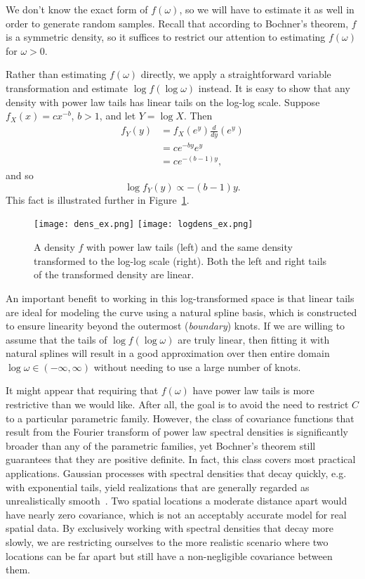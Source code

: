 We don't know the exact form of $f(\omega)$, so we will have to estimate it as well in order to generate random samples. Recall that according to Bochner's theorem, $f$ is a symmetric density, so it suffices to restrict our attention to estimating $f(\omega)$ for $\omega > 0$.

Rather than estimating $f(\omega)$ directly, we apply a straightforward variable transformation and estimate $\log f(\log \omega)$ instead. It is easy to show that any density with power law tails has linear tails on the log-log scale. Suppose $f_X(x) = cx^{-b}$, $b > 1$, and let $Y = \log X$. Then
\begin{align*}
	f_Y(y) &= f_X(e^y) \frac{d}{dy}(e^y) \\
	&= ce^{-by}e^y \\
	&= ce^{-(b-1)y},
\end{align*}
and so
\[
	\log f_Y(y) \propto -(b-1)y.
\]
This fact is illustrated further in Figure~\ref{fig:logdens_ex}.

\begin{figure}[!htb]
	\centering
	\texttt{[image: dens\_ex.png]}
	\texttt{[image: logdens\_ex.png]}
	\caption{\small A density $f$ with power law tails (left) and the same density transformed to the log-log scale (right). Both the left and right tails of the transformed density are linear.}
	\label{fig:logdens_ex}
\end{figure}

An important benefit to working in this log-transformed space is that linear tails are ideal for modeling the curve using a natural spline basis, which is constructed to ensure linearity beyond the outermost (\emph{boundary}) knots. If we are willing to assume that the tails of $\log f(\log \omega)$ are truly linear, then fitting it with natural splines will result in a good approximation over then entire domain $\log \omega \in (-\infty, \infty)$ without needing to use a large number of knots.

It might appear that requiring that $f(\omega)$ have power law tails is more restrictive than we would like. After all, the goal is to avoid the need to restrict $C$ to a particular parametric family. However, the class of covariance functions that result from the Fourier transform of power law spectral densities is significantly broader than any of the parametric families, yet Bochner's theorem still guarantees that they are positive definite. In fact, this class covers most practical applications. Gaussian processes with spectral densities that decay quickly, e.g. with exponential tails, yield realizations that are generally regarded as unrealistically smooth~\cite{Stein1999}. Two spatial locations a moderate distance apart would have nearly zero covariance, which is not an acceptably accurate model for real spatial data. By exclusively working with spectral densities that decay more slowly, we are restricting ourselves to the more realistic scenario where two locations can be far apart but still have a non-negligible covariance between them.

